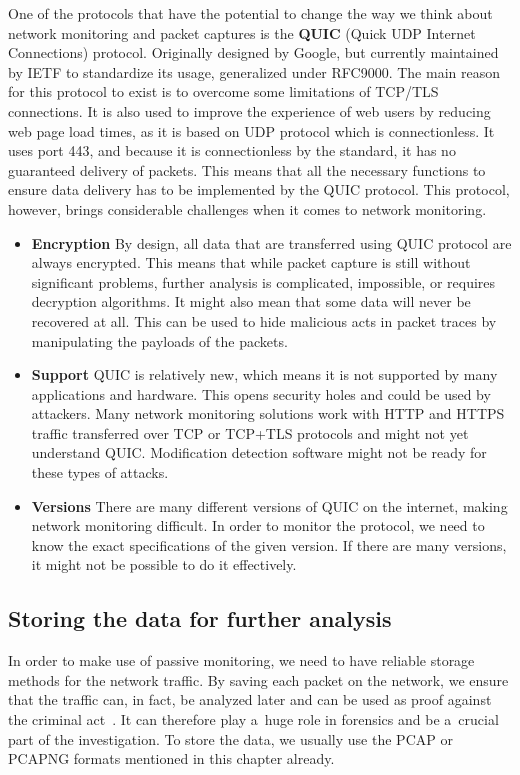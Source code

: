 \documentclass[
  printed,     %
  color,       %
  oneside,     %
  nosansbold,  %
  nocolorbold, %
  nolof,         %
  nolot,         %
]{fithesis4}
\begin{document}
One of the protocols that have the potential to change the way we think about network monitoring and packet captures is the \textbf{QUIC} (Quick UDP Internet Connections) protocol. Originally designed by Google, but currently maintained by IETF to standardize its usage, generalized under RFC9000. The main reason for this protocol to exist is to overcome some limitations of TCP/TLS connections. It is also used to improve the experience of web users by reducing web page load times, as it is based on UDP protocol which is connectionless. It uses port 443, and because it is connectionless by the standard, it has no guaranteed delivery of packets. This means that all the necessary functions to ensure data delivery has to be implemented by the QUIC protocol. This protocol, however, brings considerable challenges when it comes to network monitoring. 

\begin{itemize}
    \item \textbf{Encryption} By design, all data that are transferred using QUIC protocol are always encrypted. This means that while packet capture is still without significant problems, further analysis is complicated, impossible, or requires decryption algorithms. It might also mean that some data will never be recovered at all. This can be used to hide malicious acts in packet traces by manipulating the payloads of the packets.
    \item \textbf{Support} QUIC is relatively new, which means it is not supported by many applications and hardware. This opens security holes and could be used by attackers. Many network monitoring solutions work with HTTP and HTTPS traffic transferred over TCP or TCP+TLS protocols and might not yet understand QUIC. Modification detection software might not be ready for these types of attacks.
    \item \textbf{Versions} There are many different versions of QUIC on the internet, making network monitoring difficult. In order to monitor the protocol, we need to know the exact specifications of the given version. If there are many versions, it might not be possible to do it effectively.
\end{itemize}

\subsection{Storing the data for further analysis}

In order to make use of passive monitoring, we need to have reliable storage methods for the network traffic. By saving each packet on the network, we ensure that the traffic can, in fact, be analyzed later and can be used as proof against the criminal act~\cite{ABBASI202119}. It can therefore play a~huge role in forensics and be a~crucial part of the investigation. To store the data, we usually use the PCAP or PCAPNG formats mentioned in this chapter already. 
\end{document}
